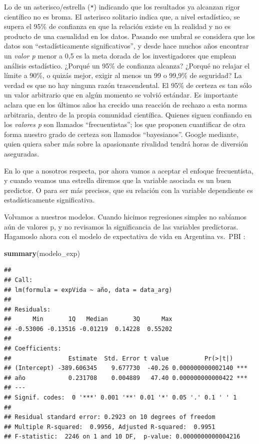 \documentclass[]{book}
\newenvironment{Shaded}{\begin{snugshade}}{\end{snugshade}}
\newcommand{\KeywordTok}[1]{\textcolor[rgb]{0.13,0.29,0.53}{\textbf{#1}}}
\newcommand{\NormalTok}[1]{#1}
\begin{document}
Lo de un asterisco/estrella (\texttt{*}) indicando que los resultados ya
alcanzan rigor científico no es broma. El asterisco solitario indica
que, a nivel estadístico, se supera el 95\% de confianza en que la
relación existe en la realidad y no es producto de una casualidad en los
datos. Pasando ese umbral se considera que los datos son
``estadísticamente significativos'', y desde hace muchos años encontrar
un \emph{valor p} menor a 0,5 es la meta dorada de los investigadores
que emplean análisis estadístico. ¿Porqué un 95\% de confianza alcanza?
¿Porqué no relajar el límite a 90\%, o quizás mejor, exigir al menos un
99 o 99,9\% de seguridad? La verdad es que no hay ninguna razón
trascendental. El 95\% de certeza es tan sólo un valor arbitrario que en
algún momento se volvió estándar. Es importante aclara que en los
últimos años ha crecido una reacción de rechazo a esta norma arbitraria,
dentro de la propia comunidad científica. Quienes siguen confiando en
los \emph{valores p} son llamados ``frecuentistas''; los que proponen
cuantificar de otra forma nuestro grado de certeza son llamados
``bayesianos''. Google mediante, quien quiera saber más sobre la
apasionante rivalidad tendrá horas de diversión aseguradas.

En lo que a nosotros respecta, por ahora vamos a aceptar el enfoque
frecuentista, y cuando veamos una estrella diremos que la variable
asociada es un buen predictor. O para ser más precisos, que su relación
con la variable dependiente es estadísticamente significativa.

Volvamos a nuestros modelos. Cuando hicimos regresiones simples no
sabíamos aún de valores p, y no revisamos la significancia de las
variables predictoras. Hagamoslo ahora con el modelo de expectativa de
vida en Argentina vs.~PBI :

\begin{Shaded}
\begin{Highlighting}[]
\KeywordTok{summary}\NormalTok{(modelo_exp)}
\end{Highlighting}
\end{Shaded}

\begin{verbatim}
## 
## Call:
## lm(formula = expVida ~ año, data = data_arg)
## 
## Residuals:
##      Min       1Q   Median       3Q      Max 
## -0.53006 -0.13516 -0.01219  0.14228  0.55202 
## 
## Coefficients:
##                Estimate  Std. Error t value          Pr(>|t|)    
## (Intercept) -389.606345    9.677730  -40.26 0.000000000002140 ***
## año            0.231708    0.004889   47.40 0.000000000000422 ***
## ---
## Signif. codes:  0 '***' 0.001 '**' 0.01 '*' 0.05 '.' 0.1 ' ' 1
## 
## Residual standard error: 0.2923 on 10 degrees of freedom
## Multiple R-squared:  0.9956, Adjusted R-squared:  0.9951 
## F-statistic:  2246 on 1 and 10 DF,  p-value: 0.0000000000004216
\end{verbatim}
\end{document}
